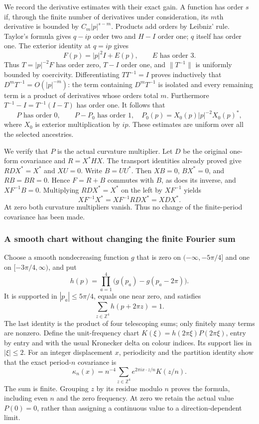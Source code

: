 We record the derivative estimates with their exact gain. A function
has order $s$ if, through the finite number of derivatives under
consideration, its $m$th derivative is bounded by
$C_m|p|^{s-m}$. Products add orders by Leibniz' rule.
Taylor's formula gives $q-ip$ order two and $H-I$ order one;
$q$ itself has order one. The exterior identity at $q=ip$ gives
\[
 F(p)=|p|^2I+E(p),\qquad E\text{ has order }3.
\]
Thus $T=|p|^{-2}F$ has order zero, $T-I$ order one, and
$\|T^{-1}\|$ is uniformly bounded by coercivity. Differentiating
$TT^{-1}=I$ proves inductively that $D^mT^{-1}=O(|p|^{-m})$:
the term containing $D^mT^{-1}$ is isolated and every remaining
term is a product of derivatives whose orders total $m$.
Furthermore $T^{-1}-I=T^{-1}(I-T)$ has order one. It follows that
\begin{equation}\label{eq:actual-symbol-orders}
 P\text{ has order }0,\qquad P-P_0\text{ has order }1,
 \quad P_0(p)=X_0(p)|p|^{-2}X_0(p)^*,
\end{equation}
where $X_0$ is exterior multiplication by $ip$.
These estimates are uniform over all the selected ancestries.

We verify that $P$ is the actual curvature multiplier. Let $D$ be
the original one-form covariance and $R=X^*HX$. The transport
identities already proved give $RDX^*=X^*$ and $XU=0$.
Write $B=UU^*$. Then $XB=0$, $BX^*=0$, and $RB=BR=0$.
Hence $F=R+B$ commutes with $B$, as does its inverse, and
$XF^{-1}B=0$. Multiplying $RDX^*=X^*$ on the left by
$XF^{-1}$ yields
\[
 XF^{-1}X^*=XF^{-1}RDX^*=XDX^*.
\]
At zero both curvature multipliers vanish. Thus no change of the
finite-period covariance has been made.

\subsubsection{A smooth chart without changing the finite Fourier sum}

Choose a smooth nondecreasing function $g$ that is zero on
$(-\infty,-5\pi/4]$ and one on $[-3\pi/4,\infty)$, and put
\[
 h(p)=\prod_{a=1}^4\bigl(g(p_a)-g(p_a-2\pi)\bigr).
\]
It is supported in $|p_a|\le5\pi/4$, equals one near zero,
and satisfies
\[
                 \sum_{z\in\mathbb Z^4}h(p+2\pi z)=1.
\]
The last identity is the product of four telescoping sums; only
finitely many terms are nonzero. Define the unit-frequency chart
$K(\xi)=h(2\pi\xi)P(2\pi\xi)$, entry by entry and with the
usual Kronecker delta on colour indices. Its support lies in
$|\xi|\le2$. For an integer displacement $x$, periodicity and
the partition identity show that the exact period-$n$ covariance is
\begin{equation}\label{eq:actual-chart-sum}
 \kappa_n(x)=n^{-4}\sum_{z\in\mathbb Z^4}
              e^{2\pi i x\cdot z/n}K(z/n).
\end{equation}
The sum is finite. Grouping $z$ by its residue modulo $n$ proves
the formula, including even $n$ and the zero frequency. At zero
we retain the actual value $P(0)=0$, rather than assigning a
continuous value to a direction-dependent limit.

